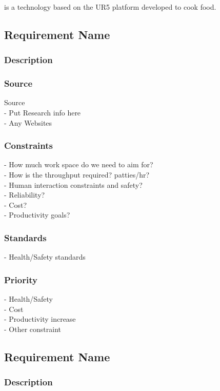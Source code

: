 \productname{} is a technology based on the UR5 platform developed to cook food.

\subsection{Requirement Name}
\subsubsection{Description}

\subsubsection{Source}
Source \\
- Put Research info here\\
- Any Websites
\subsubsection{Constraints}
- How much work space do we need to aim for?\\
- How is the throughput required? patties/hr?\\
- Human interaction constraints and safety?\\
- Reliability? \\
- Cost? \\
- Productivity goals?
\subsubsection{Standards}
- Health/Safety standards\\
\subsubsection{Priority}
- Health/Safety\\
- Cost\\
- Productivity increase \\
- Other constraint\\



\subsection{Requirement Name}
\subsubsection{Description}

